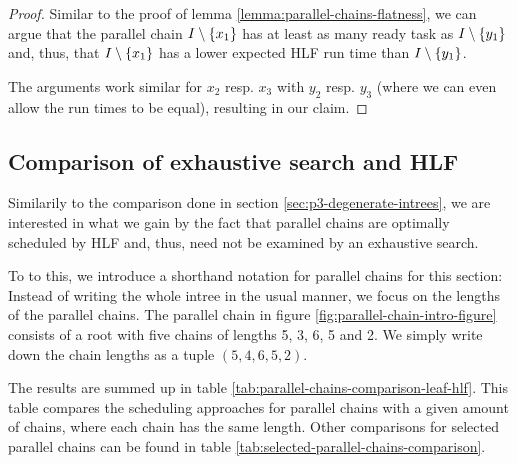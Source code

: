 \begin{proof}
  Similar to the proof of lemma \ref{lemma:parallel-chains-flatness}, we can argue that the parallel chain $I\setminus\{x_1\}$ has at least as many ready task as $I\setminus\{y_1\}$ and, thus, that $I\setminus\{x_1\}$ has a lower expected HLF run time than $I\setminus\{y_1\}$.

  The arguments work similar for $x_2$ resp. $x_3$ with $y_2$ resp. $y_3$ (where we can even allow the run times to be equal), resulting in our claim.

\end{proof}

\subsection{Comparison of exhaustive search and HLF}
\label{sec:parallel-chains-benchmarking}

Similarily to the comparison done in section \ref{sec:p3-degenerate-intrees}, we are interested in what we gain by the fact that parallel chains are optimally scheduled by HLF and, thus, need not be examined by an exhaustive search. 

To to this, we introduce a shorthand notation for parallel chains for this section: Instead of writing the whole intree in the usual manner, we focus on the lengths of the parallel chains. The parallel chain in figure \ref{fig:parallel-chain-intro-figure} consists of a root with five chains of lengths 5, 3, 6, 5 and 2. We simply write down the chain lengths as a tuple $(5,4,6,5,2)$.

The results are summed up in table \ref{tab:parallel-chains-comparison-leaf-hlf}. This table compares the scheduling approaches for parallel chains with a given amount of chains, where each chain has the same length. Other comparisons for selected parallel chains can be found in table \ref{tab:selected-parallel-chains-comparison}.

